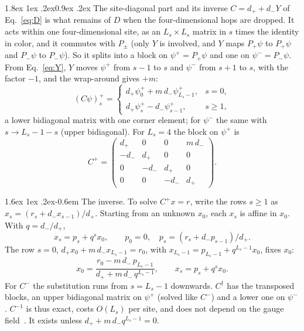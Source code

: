 \documentclass[11pt,a4paper]{article}
\makeatletter
\renewcommand\subsubsection{\@startsection{subsubsection}{3}{\z@}%
  {1.8ex \@plus 1ex \@minus .2ex}{0.9ex \@plus .2ex}%
  {\centering\normalfont\small\bfseries\itshape}}
\renewcommand\paragraph{\@startsection{paragraph}{4}{\z@}%
  {1.6ex \@plus 1ex \@minus .2ex}{-0.6em}%
  {\normalfont\normalsize\itshape}}
\numberwithin{equation}{section}
\newcommand{\dg}{^{\dagger}}
\newcommand{\Pp}{P_{+}}
\newcommand{\Pm}{P_{-}}
\makeatother
\begin{document}
\subsubsection{The site-diagonal part and its inverse}
\label{sec:C}
$C=d_++d_-Y$ of Eq.~\eqref{eq:D} is what remains of $D$ when the four-dimensional hops are
dropped. It acts within one four-dimensional site, as an $L_s\times L_s$ matrix in $s$ times
the identity in color, and it commutes with $P_\pm$ (only $Y$ is involved, and $Y$ maps
$\Pp\psi$ to $\Pp\psi$ and $\Pm\psi$ to $\Pm\psi$). So it splits into a block on
$\psi^+=\Pp\psi$ and one on $\psi^-=\Pm\psi$. From Eq.~\eqref{eq:Y}, $Y$ moves $\psi^+$ from
$s-1$ to $s$ and $\psi^-$ from $s+1$ to $s$, with the factor $-1$, and the wrap-around gives
$+m$:
\begin{equation}
(C\psi)^+_s=\begin{cases}d_+\psi^+_0+m\,d_-\psi^+_{L_s-1}, & s=0,\\
d_+\psi^+_s-d_-\psi^+_{s-1}, & s\ge1,\end{cases}
\label{eq:Cblocks}
\end{equation}
a lower bidiagonal matrix with one corner element; for $\psi^-$ the same with
$s\to L_s-1-s$ (upper bidiagonal). For $L_s=4$ the block on $\psi^+$ is
\begin{equation}
C^+=\begin{pmatrix}d_+&0&0&m\,d_-\\-d_-&d_+&0&0\\0&-d_-&d_+&0\\0&0&-d_-&d_+\end{pmatrix}.
\end{equation}

\paragraph{The inverse.} To solve $C^+x=r$, write the rows $s\ge1$ as
$x_s=(r_s+d_-x_{s-1})/d_+$. Starting from an unknown $x_0$, each $x_s$ is affine in $x_0$.
With $q=d_-/d_+$,
\begin{equation}
x_s=p_s+q^{s}x_0,\qquad p_0=0,\quad p_s=(r_s+d_-p_{s-1})/d_+ .
\end{equation}
The row $s=0$,
$d_+x_0+m\,d_-x_{L_s-1}=r_0$, with $x_{L_s-1}=p_{L_s-1}+q^{L_s-1}x_0$, fixes $x_0$:
\begin{equation}
x_0=\frac{r_0-m\,d_-\,p_{L_s-1}}{d_++m\,d_-\,q^{L_s-1}},\qquad x_s=p_s+q^{s}x_0 .
\label{eq:Cinv}
\end{equation}
For $C^-$ the substitution runs from $s=L_s-1$ downwards. $C\dg$ has the transposed blocks,
an upper bidiagonal matrix on $\psi^+$ (solved like $C^-$) and a lower one on $\psi^-$. $C^{-1}$
is thus exact, costs $O(L_s)$ per site, and does not depend on the gauge field~\cite{KCM2024}.
It exists unless $d_++m\,d_-q^{L_s-1}=0$.
\end{document}
